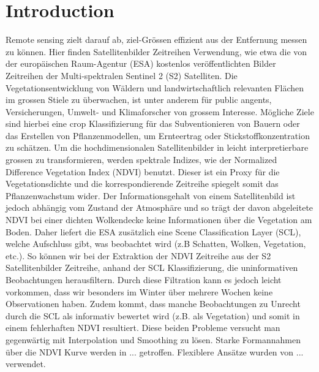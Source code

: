 \chapter{Introduction}

Remote sensing zielt darauf ab, ziel-Grössen effizient aus der Entfernung messen zu können. Hier finden Satellitenbilder Zeitreihen Verwendung, wie etwa die von der europäischen Raum-Agentur (ESA) kostenlos veröffentlichten Bilder Zeitreihen der Multi-spektralen Sentinel 2 (S2) Satelliten.
Die Vegetationsentwicklung von Wäldern und landwirtschaftlich relevanten Flächen im grossen Stiele zu überwachen, ist unter anderem für public angents, Versicherungen, Umwelt- und Klimaforscher von grossem Interesse. Mögliche Ziele sind hierbei eine crop Klassifizierung für das Subventionieren von Bauern oder das Erstellen von Pflanzenmodellen, um Ernteertrag oder Stickstoffkonzentration zu schätzen. 
Um die hochdimensionalen Satellitenbilder in leicht interpretierbare grossen zu transformieren, werden spektrale Indizes, wie der Normalized Difference Vegetation Index (NDVI) benutzt. Dieser ist ein Proxy für die Vegetationsdichte und die korrespondierende Zeitreihe spiegelt somit das Pflanzenwachstum wider. 
Der Informationsgehalt von einem Satellitenbild ist jedoch abhängig vom Zustand der Atmosphäre und so trägt der davon abgeleitete NDVI bei einer dichten Wolkendecke keine Informationen über die Vegetation am Boden. Daher liefert die ESA zusätzlich eine Scene Classification Layer (SCL), welche Aufschluss gibt, was beobachtet wird (z.B Schatten, Wolken, Vegetation, etc.). So können wir bei der Extraktion der NDVI Zeitreihe aus der S2 Satellitenbilder Zeitreihe, anhand der SCL Klassifizierung, die uninformativen Beobachtungen herausfiltern. Durch diese Filtration kann es jedoch leicht vorkommen, dass wir besonders im Winter über mehrere Wochen keine Observationen haben. Zudem kommt, dass manche Beobachtungen zu Unrecht durch die SCL als informativ bewertet wird (z.B. als Vegetation) und somit in einem fehlerhaften NDVI resultiert. 
Diese beiden Probleme versucht man gegenwärtig mit Interpolation und Smoothing zu lösen. Starke Formannahmen über die NDVI Kurve werden in ... getroffen. Flexiblere Ansätze wurden von ... verwendet. 

